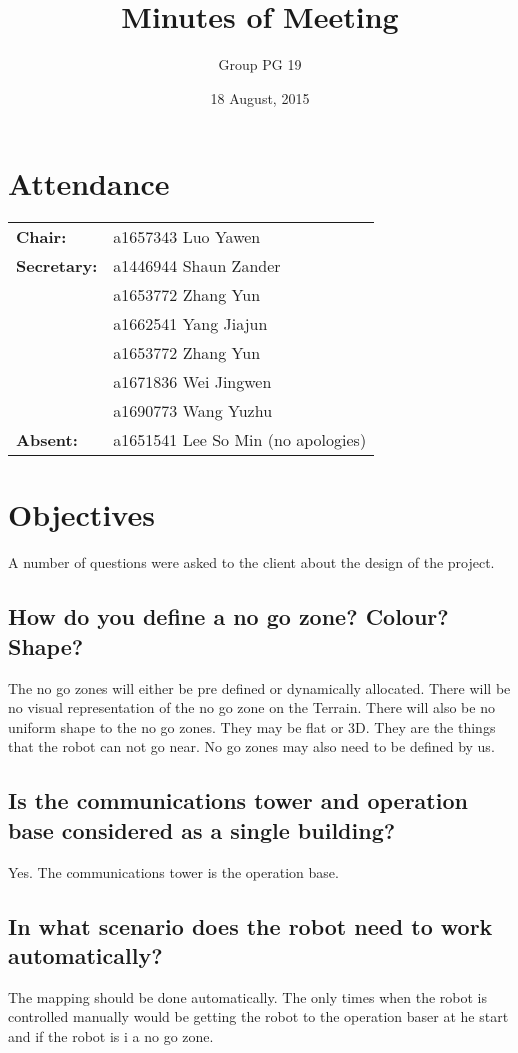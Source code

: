 \documentclass[a4paper]{article}
\title{Minutes of Meeting}
\author{Group PG 19}
\date{18 August, 2015}
\begin{document}
\maketitle
\section*{Attendance}
\begin{tabular}{l l}
\textbf{Chair:} &a1657343 Luo Yawen\\
\textbf{Secretary:}&a1446944 Shaun Zander\\
&a1653772 Zhang Yun\\
&a1662541 Yang Jiajun\\
&a1653772 Zhang Yun\\
&a1671836 Wei Jingwen\\
&a1690773 Wang Yuzhu\\
\textbf{Absent:}&a1651541 Lee So Min (no apologies)
\end{tabular}

\section{Objectives}
A number of questions were asked to the client about the design of the project.

\subsection{How do you define a no go zone? Colour? Shape?}
The no go zones will either be pre defined or dynamically allocated. There will be no visual representation of the no go zone on the Terrain. There will also be no uniform shape to the no go zones. They may be flat or 3D. They are the things that the robot can not go near. No go zones may also need to be defined by us.

\subsection{Is the communications tower and operation base considered as a single building?}
Yes. The communications tower is the operation base.

\subsection{In what scenario does the robot need to work automatically?}
The mapping should be done automatically. The only times when the robot is controlled manually would be getting the robot to the operation baser at he start and if the robot is i a no go zone.
\end{document}
